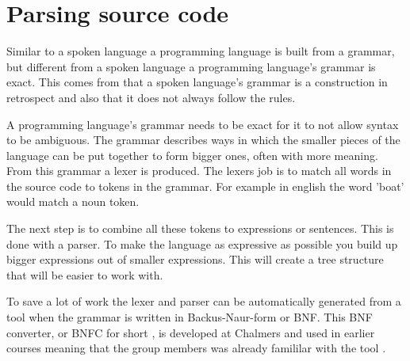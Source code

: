 \section{Parsing source code} \label{sec:bnfc}



Similar to a spoken language a programming language is built from a grammar, but different from a spoken language a programming language's grammar is exact. This comes from that a spoken language's grammar is a construction in retrospect and also that it does not always follow the rules. 




A programming language's grammar needs to be exact for it to not allow syntax to be ambiguous. The grammar describes ways in which the smaller pieces of the language can be put together to form bigger ones, often with more meaning. From this grammar a lexer is produced. The lexers job is to match all words in the source code to tokens in the grammar. For example in english the word 'boat' would match a noun token.


The next step is to combine all these tokens to expressions or sentences. This is done with a parser. To make the language as expressive as possible you build up bigger expressions out of smaller expressions. This will create a tree structure that will be easier to work with. 

To save a lot of work the lexer and parser can be automatically generated from a tool when the grammar is written in Backus-Naur-form or BNF. This BNF converter, or BNFC for short , is developed at Chalmers and used in earlier courses meaning that the group members was already famililar with the tool .


